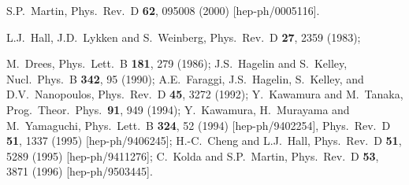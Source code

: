 \documentclass[11pt]{article}
\begin{document}
\begin{thebibliography}{999}
  S.P.~Martin,
  Phys.\ Rev.\  D {\bf 62}, 095008 (2000)
  [hep-ph/0005116].

  L.J.~Hall, J.D.~Lykken and S.~Weinberg, 
  Phys.\ Rev.\ D {\bf 27}, 2359 (1983);

M.~Drees, 
  Phys.\ Lett.\ B {\bf 181}, 279 (1986);
J.S.~Hagelin and S.~Kelley, 
  Nucl.\ Phys.\ B {\bf 342}, 95 (1990);
A.E.~Faraggi, J.S.~Hagelin, S.~Kelley, and D.V.~Nanopoulos,
  Phys.\ Rev.\ D {\bf 45}, 3272 (1992);
Y.~Kawamura and M.~Tanaka, 
  Prog.\ Theor.\ Phys.\  {\bf 91}, 949 (1994);
Y.~Kawamura, H.~Murayama and M.~Yamaguchi,
  Phys.\ Lett.\ B {\bf 324}, 52 (1994)
  [hep-ph/9402254],
  Phys.\ Rev.\ D {\bf 51}, 1337 (1995)
  [hep-ph/9406245];
H.-C.~Cheng and L.J.~Hall, 
  Phys.\ Rev.\ D {\bf 51}, 5289 (1995)
  [hep-ph/9411276];
C.~Kolda and S.P.~Martin, 
  Phys.\ Rev.\ D {\bf 53}, 3871 (1996)
  [hep-ph/9503445].


\end{thebibliography}
\end{document}
